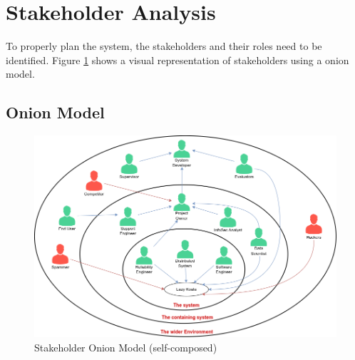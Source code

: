 \section{Stakeholder Analysis}

To properly plan the system, the stakeholders and their roles need to be identified. Figure \ref{fig:stakeholder-onion} shows a visual representation of stakeholders using a onion model.

\subsection{Onion Model}

\begin{figure}[H]
    \includegraphics[width=15cm]{assets/requirement-specification/onion-model.png}
    \caption{Stakeholder Onion Model (self-composed)}
    \label{fig:stakeholder-onion}
\end{figure}


